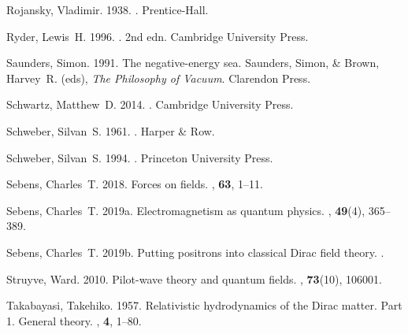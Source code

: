 \documentclass[onecolumn,secnumarabic,amsmath,amssymb,balancelastpage,nofootinbib]{article}
\begin{document}
\begin{thebibliography}{}
Rojansky, Vladimir. 1938.
.
\newblock Prentice-Hall.

Ryder, Lewis~H. 1996.
. 2nd edn.
\newblock Cambridge University Press.

Saunders, Simon. 1991.
\newblock The negative-energy sea.
 Saunders, Simon, \& Brown, Harvey~R. (eds),
  {\em The Philosophy of Vacuum}.
\newblock Clarendon Press.

Schwartz, Matthew~D. 2014.
.
\newblock Cambridge University Press.

Schweber, Silvan~S. 1961.
.
\newblock Harper \& Row.

Schweber, Silvan~S. 1994.
.
\newblock Princeton University Press.

Sebens, Charles~T. 2018.
\newblock Forces on fields.
, {\bf 63},
  1--11.

Sebens, Charles~T. 2019a.
\newblock Electromagnetism as quantum physics.
, {\bf 49}(4), 365--389.

Sebens, Charles~T. 2019b.
\newblock Putting positrons into classical Dirac field theory.
.

Struyve, Ward. 2010.
\newblock Pilot-wave theory and quantum fields.
, {\bf 73}(10), 106001.

Takabayasi, Takehiko. 1957.
\newblock Relativistic hydrodynamics of the Dirac matter. Part 1. General
  theory.
, {\bf 4}, 1--80.


\end{thebibliography}
\end{document}
